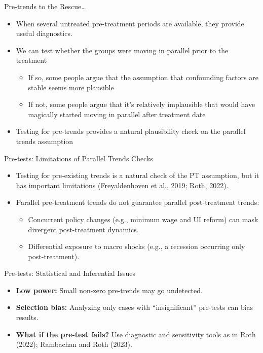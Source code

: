 \documentclass[11pt,aspectratio=169]{beamer}
\begin{document}
\begin{frame}{Pre-trends to the Rescue\dots}
\begin{itemize}
  \item When several untreated pre-treatment periods are available, they provide useful diagnostics.
  \item We can test whether the groups were moving in parallel prior to the treatment
  \begin{itemize}
    \item If so, some people argue that the assumption that confounding factors are stable seems more plausible
    \item If not, some people argue that it's relatively implausible that would have magically started moving in parallel after treatment date
  \end{itemize}
  \item Testing for pre-trends provides a natural plausibility check on the parallel trends assumption
\end{itemize}
\end{frame}

\begin{frame}{Pre-tests: Limitations of Parallel Trends Checks}
\begin{itemize}
  \item Testing for pre-existing trends is a natural check of the PT assumption, but it has important limitations (Freyaldenhoven et al., 2019; Roth, 2022).
  \item Parallel pre-treatment trends do not guarantee parallel post-treatment trends:
  \begin{itemize}
    \item Concurrent policy changes (e.g., minimum wage and UI reform) can mask divergent post-treatment dynamics.
    \item Differential exposure to macro shocks (e.g., a recession occurring only post-treatment).
  \end{itemize}
\end{itemize}
\end{frame}

\begin{frame}{Pre-tests: Statistical and Inferential Issues}
\begin{itemize}
  \item \textbf{Low power:} Small non-zero pre-trends may go undetected.
  \item \textbf{Selection bias:} Analyzing only cases with ``insignificant'' pre-tests can bias results.
  \item \textbf{What if the pre-test fails?} Use diagnostic and sensitivity tools as in Roth (2022); Rambachan and Roth (2023).
\end{itemize}
\end{frame}
\end{document}
